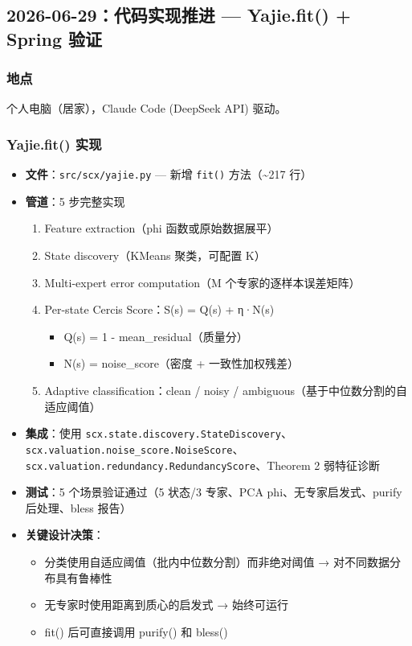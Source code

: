 \documentclass[
  12pt,
]{ctexart}
\providecommand{\tightlist}{%
  \setlength{\itemsep}{0pt}\setlength{\parskip}{0pt}}
\begin{document}
\subsection{2026-06-29：代码实现推进 --- Yajie.fit() + Spring
验证}\label{ux4ee3ux7801ux5b9eux73b0ux63a8ux8fdb-yajie.fit-spring-ux9a8cux8bc1}

\subsubsection{地点}\label{ux5730ux70b9-2}

个人电脑（居家），Claude Code (DeepSeek API) 驱动。

\subsubsection{Yajie.fit() 实现}\label{yajie.fit-ux5b9eux73b0}

\begin{itemize}
\tightlist
\item
  \textbf{文件}：\texttt{src/scx/yajie.py} --- 新增 \texttt{fit()}
  方法（\textasciitilde217 行）
\item
  \textbf{管道}：5 步完整实现

  \begin{enumerate}
  \def\labelenumi{\arabic{enumi}.}
  \tightlist
  \item
    Feature extraction（phi 函数或原始数据展平）
  \item
    State discovery（KMeans 聚类，可配置 K）
  \item
    Multi-expert error computation（M 个专家的逐样本误差矩阵）
  \item
    Per-state Cercis Score：S(s) = Q(s) + η·N(s)

    \begin{itemize}
    \tightlist
    \item
      Q(s) = 1 - mean\_residual（质量分）
    \item
      N(s) = noise\_score（密度 + 一致性加权残差）
    \end{itemize}
  \item
    Adaptive classification：clean / noisy /
    ambiguous（基于中位数分割的自适应阈值）
  \end{enumerate}
\item
  \textbf{集成}：使用
  \texttt{scx.state.discovery.StateDiscovery}、\texttt{scx.valuation.noise\_score.NoiseScore}、\texttt{scx.valuation.redundancy.RedundancyScore}、Theorem
  2 弱特征诊断
\item
  \textbf{测试}：5 个场景验证通过（5 状态/3 专家、PCA
  phi、无专家启发式、purify 后处理、bless 报告）
\item
  \textbf{关键设计决策}：

  \begin{itemize}
  \tightlist
  \item
    分类使用自适应阈值（批内中位数分割）而非绝对阈值 →
    对不同数据分布具有鲁棒性
  \item
    无专家时使用距离到质心的启发式 → 始终可运行
  \item
    fit() 后可直接调用 purify() 和 bless()
  \end{itemize}
\end{itemize}
\end{document}
